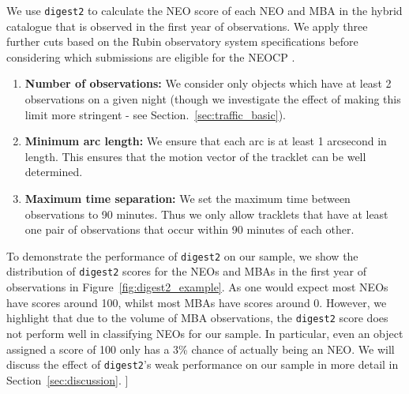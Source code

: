 \documentclass[twocolumn]{aastex631}
\newcommand{\todo}[1]{{\color{red}{[TODO: #1}]}}
\newcommand{\dig}{\texttt{digest2}}
\begin{document}
We use \dig{} to calculate the NEO score of each NEO and MBA in the hybrid catalogue that is observed in the first year of observations. We apply three further cuts based on the Rubin observatory system specifications before considering which submissions are eligible for the NEOCP \citep{oss}.
\begin{enumerate}
    \item \textbf{Number of observations:} We consider only objects which have at least 2 observations on a given night (though we investigate the effect of making this limit more stringent - see Section.~\ref{sec:traffic_basic}).
    \item \textbf{Minimum arc length:} We ensure that each arc is at least 1 arcsecond in length. This ensures that the motion vector of the tracklet can be well determined.
    \item \textbf{Maximum time separation:} We set the maximum time between observations to 90 minutes. Thus we only allow tracklets that have at least one pair of observations that occur within 90 minutes of each other.
\end{enumerate}

 To demonstrate the performance of \dig{} on our sample, we show the distribution of \dig{} scores for the NEOs and MBAs in the first year of observations in Figure~\ref{fig:digest2_example}. As one would expect most NEOs have scores around 100, whilst most MBAs have scores around 0. However, we highlight that due to the volume of MBA observations, the \dig{} score does not perform well in classifying NEOs for our sample. In particular, even an object assigned a score of 100 only has a 3\% chance of actually being an NEO. We will discuss the effect of \dig{}'s weak performance on our sample in more detail in Section~\ref{sec:discussion}. \todo{not sure if this is right place for this}
\end{document}

